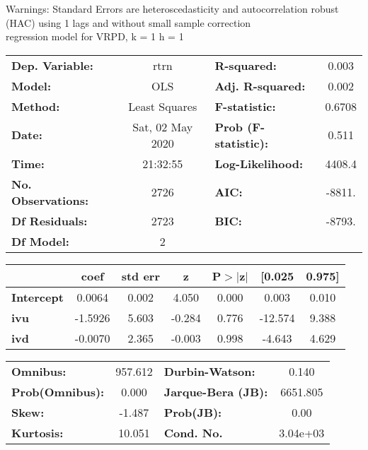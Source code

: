 Warnings: \newline
 [1] Standard Errors are heteroscedasticity and autocorrelation robust (HAC) using 1 lags and without small sample correction\\ 

regression model for VRPD, k = 1 h = 1\begin{center}
\begin{tabular}{lclc}
\toprule
\textbf{Dep. Variable:}    &       rtrn       & \textbf{  R-squared:         } &     0.003   \\
\textbf{Model:}            &       OLS        & \textbf{  Adj. R-squared:    } &     0.002   \\
\textbf{Method:}           &  Least Squares   & \textbf{  F-statistic:       } &    0.6708   \\
\textbf{Date:}             & Sat, 02 May 2020 & \textbf{  Prob (F-statistic):} &    0.511    \\
\textbf{Time:}             &     21:32:55     & \textbf{  Log-Likelihood:    } &    4408.4   \\
\textbf{No. Observations:} &        2726      & \textbf{  AIC:               } &    -8811.   \\
\textbf{Df Residuals:}     &        2723      & \textbf{  BIC:               } &    -8793.   \\
\textbf{Df Model:}         &           2      & \textbf{                     } &             \\
\bottomrule
\end{tabular}
\begin{tabular}{lcccccc}
                   & \textbf{coef} & \textbf{std err} & \textbf{z} & \textbf{P$> |$z$|$} & \textbf{[0.025} & \textbf{0.975]}  \\
\midrule
\textbf{Intercept} &       0.0064  &        0.002     &     4.050  &         0.000        &        0.003    &        0.010     \\
\textbf{ivu}       &      -1.5926  &        5.603     &    -0.284  &         0.776        &      -12.574    &        9.388     \\
\textbf{ivd}       &      -0.0070  &        2.365     &    -0.003  &         0.998        &       -4.643    &        4.629     \\
\bottomrule
\end{tabular}
\begin{tabular}{lclc}
\textbf{Omnibus:}       & 957.612 & \textbf{  Durbin-Watson:     } &    0.140  \\
\textbf{Prob(Omnibus):} &   0.000 & \textbf{  Jarque-Bera (JB):  } & 6651.805  \\
\textbf{Skew:}          &  -1.487 & \textbf{  Prob(JB):          } &     0.00  \\
\textbf{Kurtosis:}      &  10.051 & \textbf{  Cond. No.          } & 3.04e+03  \\
\bottomrule
\end{tabular}
\end{center}

